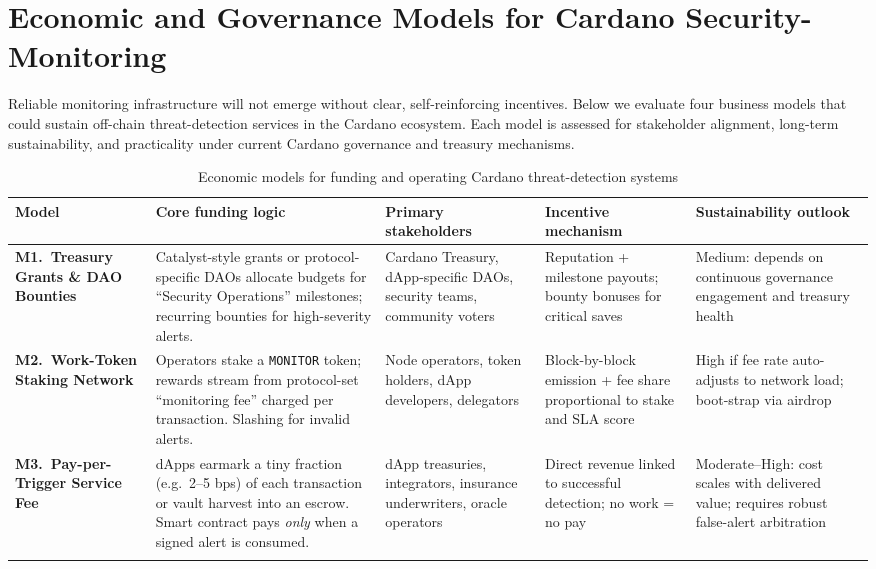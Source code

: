 \documentclass{scrreport}
\begin{document}
\section{Economic and Governance Models for Cardano Security-Monitoring}

Reliable monitoring infrastructure will not emerge without clear,
self-reinforcing incentives.  Below we evaluate four business models
that could sustain off-chain threat-detection services in the Cardano
ecosystem.  Each model is assessed for stakeholder alignment,
long-term sustainability, and practicality under current Cardano
governance and treasury mechanisms.

\begin{table}[H]
\centering
\caption{Economic models for funding and operating Cardano threat-detection systems}
\begin{tabularx}{\textwidth}{>{\raggedright\arraybackslash}p{2.8cm}%
                          >{\raggedright\arraybackslash}X%
                          >{\raggedright\arraybackslash}p{2.3cm}%
                          >{\raggedright\arraybackslash}p{2.8cm}%
                          >{\raggedright\arraybackslash}p{2cm}}
\toprule
Model & Core funding logic & Primary stakeholders & Incentive mechanism & Sustainability outlook \\ \midrule
\textbf{M1.~Treasury Grants \& DAO Bounties} &
  Catalyst-style grants or protocol-specific DAOs allocate budgets for
  “Security Operations” milestones; recurring bounties for high-severity alerts. &
  Cardano Treasury, dApp-specific DAOs, security teams, community voters &
  Reputation + milestone payouts; bounty bonuses for critical saves &
  Medium: depends on continuous governance engagement and treasury health \\ \addlinespace[0.3em]

\textbf{M2.~Work-Token \mbox{Staking} Network} &
  Operators stake a \texttt{MONITOR} token; rewards stream from protocol-set %
  “monitoring fee” charged per transaction.  Slashing for invalid alerts. &
  Node operators, token holders, dApp developers, delegators &
  Block-by-block emission + fee share proportional to stake and SLA score &
  High if fee rate auto-adjusts to network load; boot-strap via airdrop \\ \addlinespace[0.3em]

\textbf{M3.~Pay-per-Trigger Service Fee} &
  dApps earmark a tiny fraction (e.g.\ 2–5 bps) of each transaction or %
  vault harvest into an escrow.  Smart contract pays \emph{only} when a %
  signed alert is consumed. &
  dApp treasuries, integrators, insurance underwriters, oracle operators &
  Direct revenue linked to successful detection; no work = no pay &
  Moderate–High: cost scales with delivered value; requires robust %
  false-alert arbitration \\ \addlinespace[0.3em]


\end{tabularx}
\end{table}
\end{document}
